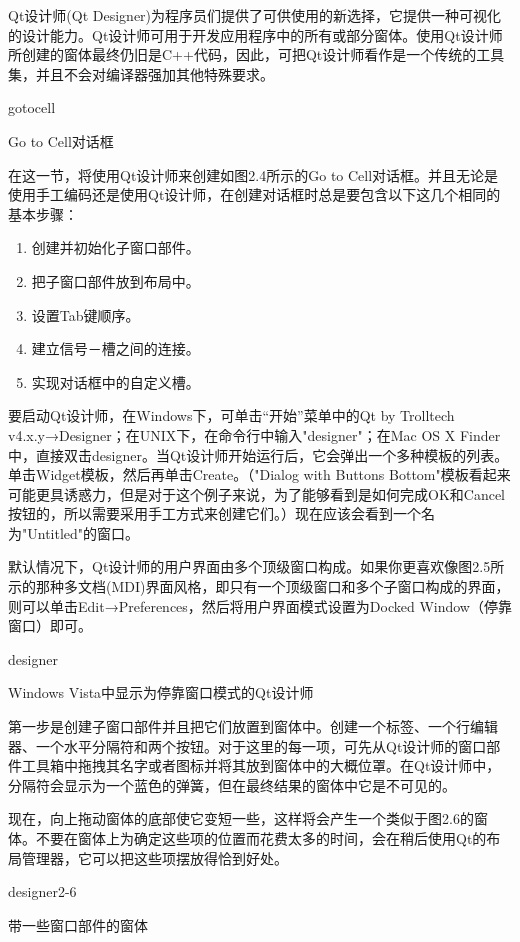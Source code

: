 \documentclass[11pt,oneside]{book}
\begin{document}
\begin{common-format}
Qt设计师(Qt Designer)为程序员们提供了可供使用的新选择，它提供一种可视化的设计能力。Qt设计师可用于开发应用程序中的所有或部分窗体。使用Qt设计师所创建的窗体最终仍旧是C++代码，因此，可把Qt设计师看作是一个传统的工具集，并且不会对编译器强加其他特殊要求。

\begin{fig}{gotocell}
\caption{Go to Cell对话框}
\label{fig:gotocell}
\end{fig}

在这一节，将使用Qt设计师来创建如图2.4所示的Go to Cell对话框。并且无论是使用手工编码还是使用Qt设计师，在创建对话框时总是要包含以下这几个相同的基本步骤：

\begin{enumerate}
\item 创建并初始化子窗口部件。
\item 把子窗口部件放到布局中。
\item 设置Tab键顺序。
\item 建立信号－槽之间的连接。
\item 实现对话框中的自定义槽。
\end{enumerate}

要启动Qt设计师，在Windows下，可单击“开始”菜单中的Qt by Trolltech v4.x.y→Designer；在UNIX下，在命令行中输入"designer"；在Mac OS X Finder中，直接双击designer。当Qt设计师开始运行后，它会弹出一个多种模板的列表。单击Widget模板，然后再单击Create。（"Dialog with Buttons Bottom"模板看起来可能更具诱惑力，但是对于这个例子来说，为了能够看到是如何完成OK和Cancel按钮的，所以需要采用手工方式来创建它们。）现在应该会看到一个名为"Untitled"的窗口。

默认情况下，Qt设计师的用户界面由多个顶级窗口构成。如果你更喜欢像图2.5所示的那种多文档(MDI)界面风格，即只有一个顶级窗口和多个子窗口构成的界面，则可以单击Edit→Preferences，然后将用户界面模式设置为Docked Window（停靠窗口）即可。
\begin{linefig}[0.8]{designer}
\caption{Windows Vista中显示为停靠窗口模式的Qt设计师}
\label{fig:designer}
\end{linefig}

第一步是创建子窗口部件并且把它们放置到窗体中。创建一个标签、一个行编辑器、一个水平分隔符和两个按钮。对于这里的每一项，可先从Qt设计师的窗口部件工具箱中拖拽其名字或者图标并将其放到窗体中的大概位罩。在Qt设计师中，分隔符会显示为一个蓝色的弹簧，但在最终结果的窗体中它是不可见的。

现在，向上拖动窗体的底部使它变短一些，这样将会产生一个类似于图2.6的窗体。不要在窗体上为确定这些项的位置而花费太多的时间，会在稍后使用Qt的布局管理器，它可以把这些项摆放得恰到好处。
\begin{fig}[0.7]{designer2-6}
\caption{带一些窗口部件的窗体}
\label{fig:designer2-6}
\end{fig}


\end{common-format}
\end{document}
